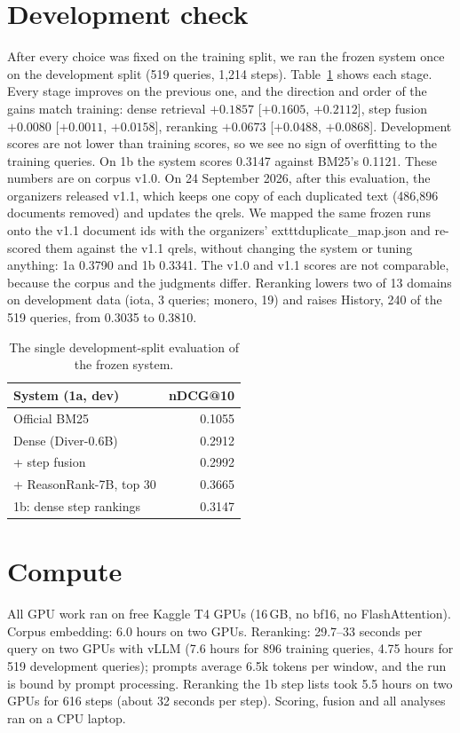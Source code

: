 \documentclass[11pt]{article}
\begin{document}
\section{Development check}
\label{sec:dev}
After every choice was fixed on the training split, we ran the frozen system once on the
development split (519 queries, 1,214 steps). %
Table~\ref{tab:dev} shows each stage. Every stage improves on the previous one, and the
direction and order of the gains match training: dense retrieval $+0.1857$
[$+0.1605$, $+0.2112$], step fusion $+0.0080$ [$+0.0011$, $+0.0158$], reranking $+0.0673$
[$+0.0488$, $+0.0868$]. Development scores are not lower than training scores, so we see no sign
of overfitting to the training queries. On 1b the system scores 0.3147 against BM25's 0.1121.
These numbers are on corpus v1.0. On 24 September 2026, after this evaluation, the organizers
released v1.1, which keeps one copy of each duplicated text (486,896 documents removed) and
updates the qrels. We mapped the same frozen runs onto the v1.1 document ids with the organizers'
	exttt{duplicate\_map.json} and re-scored them against the v1.1 qrels, without changing the
system or tuning anything: 1a 0.3790 and 1b 0.3341. %
The v1.0 and v1.1 scores are not comparable, because the corpus and the judgments differ.
Reranking lowers two of 13 domains on development data (iota, 3 queries; monero, 19) and raises
History, 240 of the 519 queries, from 0.3035 to 0.3810.

\begin{table}[t]
\centering\small
\begin{tabular}{lr}
\toprule
System (1a, dev) & nDCG@10 \\
\midrule
Official BM25 & 0.1055 \\
Dense (Diver-0.6B) & 0.2912 \\
+ step fusion & 0.2992 \\
+ ReasonRank-7B, top 30 & 0.3665 \\
\midrule
1b: dense step rankings & 0.3147 \\
\bottomrule
\end{tabular}
\caption{The single development-split evaluation of the frozen system.}
\label{tab:dev}
\end{table}

\section{Compute}
All GPU work ran on free Kaggle T4 GPUs (16\,GB, no bf16, no FlashAttention). Corpus embedding:
6.0 hours on two GPUs. Reranking: 29.7--33 seconds per query on two GPUs with vLLM (7.6 hours for
896 training queries, 4.75 hours for 519 development queries); prompts average 6.5k tokens per window, and the run is bound by prompt processing.
Reranking the 1b step lists took 5.5 hours on two GPUs for 616 steps (about 32 seconds per step).
Scoring, fusion and all analyses ran on a CPU laptop.
\end{document}
